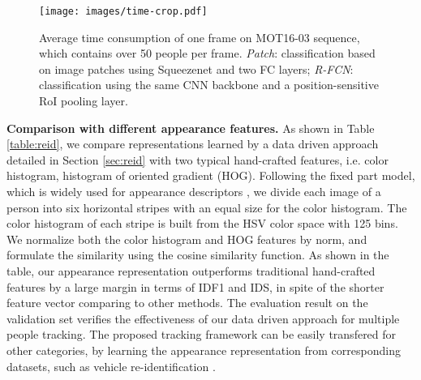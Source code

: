 \documentclass{article}
\begin{document}
\begin{figure}[t]
\begin{center}
\texttt{[image: images/time-crop.pdf]}
\end{center}
\caption{
Average time consumption of one frame on MOT16-03 sequence, which contains over 50 people per frame.
\emph{Patch}: classification based on image patches using Squeezenet and two FC layers;
\emph{R-FCN}: classification using the same CNN backbone and a position-sensitive RoI pooling layer.
}
\label{fig:time}
\end{figure}


\textbf{Comparison with different appearance features.}
As shown in Table \ref{table:reid},
we compare representations learned by a data driven approach detailed in Section \ref{sec:reid}
with two typical hand-crafted features, 
i.e. color histogram, histogram of oriented gradient (HOG). Following the fixed part model, which is widely used for appearance descriptors \cite{satta2013appearance},
we divide each image of a person into six horizontal stripes with an equal size for the color histogram.
The color histogram of each stripe is built from the HSV color space with 125 bins.
We normalize both the color histogram and HOG features by  norm,
and formulate the similarity using the cosine similarity function.
As shown in the table,
our appearance representation
outperforms traditional hand-crafted features by a large margin in terms of IDF1 and IDS,
in spite of the shorter feature vector comparing to other methods.
The evaluation result on the validation set verifies the effectiveness of 
our data driven approach for multiple people tracking.
The proposed tracking framework can be easily transfered for other categories,
by learning the appearance representation from corresponding datasets, 
such as vehicle re-identification \cite{liu2016large}.
\end{document}
